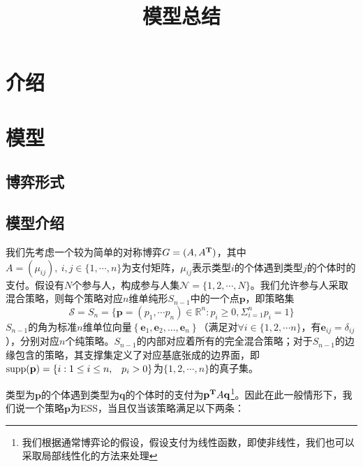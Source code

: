 \documentclass[lang=cn,12pt,a4paper]{elegantpaper}
\title{模型总结}
\date{\zhtoday}
\begin{document}
\maketitle






\section{介绍}


\section{模型}

\subsection{博弈形式}



\subsection{模型介绍}

我们先考虑一个较为简单的对称博弈$G=(A,A^{\bf{T}})$，其中$A=(\mu_{ij}),\ i,j\in\{1,\cdots,n\}$为支付矩阵，$\mu_{ij}$表示类型$i$的个体遇到类型$j$的个体时的支付。假设有$N$个参与人，构成参与人集$\mathscr{N}=\{1,2,\cdots,N\}$。我们允许参与人采取混合策略，则每个策略对应$n$维单纯形$S_{n-1}$中的一个点$\mathbf{p}$，即策略集
$$
\mathscr{S}=S_n=\{\mathbf{p}=(p_1,\cdots p_n)\in \mathbb{R} ^n :p_i\ge0,\Sigma_{i=1}^n p_i=1\}
$$
$S_{n-1}$的角为标准$n$维单位向量$\left\{\boldsymbol{e}_{1}, \boldsymbol{e}_{2}, \ldots, \boldsymbol{e}_{n}\right\}$（满足对$\forall i\in\{1,2,\cdots n\}$，有$\boldsymbol{e}_{ij}=\delta _{ij}$），分别对应$n$个纯策略。$S_{n-1}$的内部对应着所有的完全混合策略；对于$S_{n-1}$的边缘包含的策略，其支撑集定义了对应基底张成的边界面，即$\operatorname{supp}(\mathbf{p})=\left\{i: 1 \leq i \leq n \text  ,\quad p_{i}>0\right\}$为$\{1,2, \cdots ,n\}$的真子集。

类型为$\mathbf{p}$的个体遇到类型为$\mathbf{q}$的个体时的支付为$\mathbf{p}^{\bf{T}}A\mathbf{q}$\footnote{我们根据通常博弈论的假设，假设支付为线性函数，即使非线性，我们也可以采取局部线性化的方法来处理}。因此在此一般情形下，我们说一个策略$\mathbf{p}$为ESS，当且仅当该策略满足以下两条：
\end{document}
